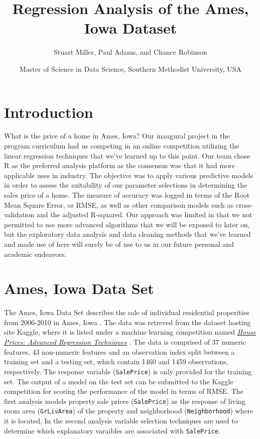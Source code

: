 \documentclass[american,]{article}
\title{Regression Analysis of the Ames, Iowa Dataset}
\author{Stuart Miller, Paul Adams, and Chance Robinson}
\date{Master of Science in Data Science, Southern Methodist University, USA}
\begin{document}
\maketitle

\hypertarget{introduction}{%
\section{Introduction}\label{introduction}}

What is the price of a home in Ames, Iowa? Our inaugural project in the
program curriculum had us competing in an online competition utilizing
the linear regression techniques that we've learned up to this point.
Our team chose R as the preferred analysis platform as the consensus was
that it had more applicable uses in industry. The objective was to apply
various predictive models in order to assess the suitability of our
parameter selections in determining the sales price of a home. The
measure of accuracy was logged in terms of the Root Mean Square Error,
or RMSE, as well as other comparison models such as cross-validation and
the adjusted R-squared. Our approach was limited in that we not
permitted to use more advanced algorithms that we will be exposed to
later on, but the exploratory data analysis and data cleaning methods
that we've learned and made use of here will surely be of use to us in
our future personal and academic endeavors.

\hypertarget{ames-iowa-data-set}{%
\section{Ames, Iowa Data Set}\label{ames-iowa-data-set}}

The Ames, Iowa Data Set describes the sale of individual residential
properities from 2006-2010 in Ames, Iowa \cite{Cock}. The data was
retreved from the dataset hosting site Kaggle, where it is listed under
a machine learning competition named
\href{https://www.kaggle.com/c/house-prices-advanced-regression-techniques/overview}{\textit{House Prices: Advanced Regression Techniques}}
\cite{Kaggle2016}. The data is comprised of 37 numeric features, 43
non-numeric features and an observation index split between a training
set and a testing set, which contain 1460 and 1459 observations,
respectively. The response variable (\texttt{SalePrice}) is only
provided for the training set. The output of a model on the test set can
be submitted to the Kaggle competition for scoring the performance of
the model in terms of RMSE. The first analysis models property sale
prices (\texttt{SalePrice}) as the response of living room area
(\texttt{GrLivArea}) of the property and neighborhood
(\texttt{Neighborhood}) where it is located. In the second analysis
variable selection techniques are used to determine which explanatory
varaibles are associated with \texttt{SalePrice}.
\end{document}
